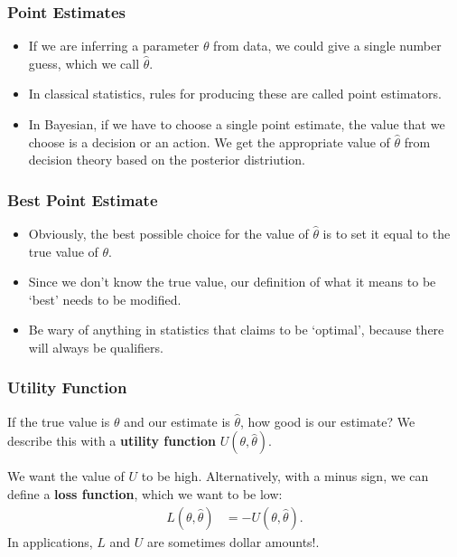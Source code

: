 \documentclass{beamer}
\begin{document}
\begin{frame}
\frametitle{Point Estimates}

\begin{itemize}
\item If we are inferring a parameter $\theta$ from data, we could
give a single number guess, which we call $\hat{\theta}$. \pause
\item In classical statistics, rules for producing these are called point
estimators. \pause
\item  In Bayesian, if we have to choose a single point estimate,
the value that we choose is a decision or an action. We
get the appropriate value of $\hat{\theta}$
from decision theory based on the posterior
distriution.
\end{itemize}

\end{frame}

\begin{frame}
\frametitle{Best Point Estimate}
\begin{itemize}
\item Obviously, the best possible choice for the value of $\hat{\theta}$ is to
set it equal to the true value of $\theta$.\pause
\item Since we don't know the true value, our definition of what it means to
be `best' needs to be modified.\pause
\item Be wary of anything in statistics that claims to be `optimal', because
there will always be qualifiers.
\end{itemize}
\end{frame}


\begin{frame}
\frametitle{Utility Function}
If the true value is $\theta$ and our estimate is $\hat{\theta}$, how good is
our estimate? We describe this with a {\bf utility function} $U(\theta, \hat{\theta})$.
\pause

We want the value of $U$ to be high. Alternatively, with a minus sign, we can
define a {\bf loss function}, which we want to be low:
\begin{align}
L(\theta, \hat{\theta}) &= -U(\theta, \hat{\theta}).
\end{align}
\pause
In applications, $L$ and $U$ are sometimes dollar amounts!.

\end{frame}
\end{document}
